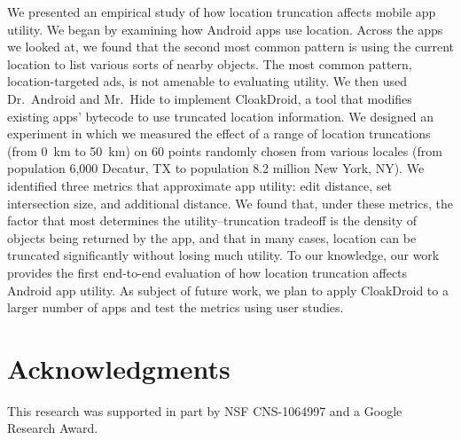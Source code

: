 \documentclass[10pt, conference, compsocconf]{IEEEtran}
\newcommand{\fuzzer}{CloakDroid\xspace}
\begin{document}
We presented an empirical study of how location truncation affects
mobile app utility. We began by examining how Android apps use
location. Across the apps we looked at, we found that the second most
common pattern is using the current location to list various sorts of
nearby objects. The most common pattern, location-targeted ads, is not
amenable to evaluating utility. We then used Dr.~Android and Mr.~Hide
to implement \fuzzer{}, a tool that
modifies existing apps' bytecode to use truncated location
information. We designed an experiment in which we measured the effect
of a range of location truncations (from 0~km to 50~km) on 60
points randomly chosen from various locales (from population 6,000
Decatur, TX to population 8.2 million New York, NY). We identified three
metrics that approximate app utility: edit distance, set intersection
size, and additional distance. We found that, under these metrics, the
factor that most determines the utility--truncation tradeoff is
the density of objects being returned by the app, and that in many
cases, location can be truncated significantly without losing much
utility. To our knowledge, our work provides the first end-to-end
evaluation of how location truncation affects Android app utility.
As subject of future work, we plan to apply CloakDroid to a larger 
number of apps and test the metrics using user studies.

\section*{Acknowledgments}

This research was supported in part by NSF CNS-1064997 and a Google
Research Award.



\end{document}
